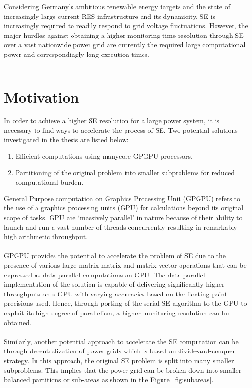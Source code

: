 \documentclass[thesis.tex]{subfiles}
\begin{document}
Considering Germany’s ambitious renewable energy targets and the state of increasingly large current RES infrastructure and its dynamicity, SE is increasingly required to readily respond to grid voltage fluctuations. However, the major hurdles against obtaining a higher monitoring time resolution through SE over a vast nationwide power grid are currently the required large computational power and correspondingly long execution times. \\\\

\section{Motivation}
In order to achieve a higher SE resolution for a large power system, it is necessary to find ways to accelerate the process of SE. Two potential solutions investigated in the thesis are listed below:
\begin{enumerate}
	\item Efficient computations using manycore GPGPU processors\cite{KarimipourAcc}.
	\item Partitioning of the original problem into smaller subproblems for reduced computational burden\cite{Xiong}\cite{Muscas}\cite{KarimipourDec}.
\end{enumerate}
General Purpose computation on Graphics Processing Unit (GPGPU) refers to the use of a graphics processing units (GPU) for calculations beyond its original scope of tasks. GPU are ‘massively parallel’ in nature because of their ability to launch and run a vast number of threads concurrently resulting in remarkably high arithmetic throughput.\\\\
GPGPU provides the potential to accelerate the problem of SE due to the presence of various large matrix-matrix and matrix-vector operations that can be expressed as data-parallel computations on GPU. The data-parallel implementation of the solution is capable of delivering significantly higher throughputs on a GPU with varying accuracies based on the floating-point precisions used. Hence, through porting of the serial SE algorithm to the GPU to exploit its high degree of parallelism, a higher monitoring resolution can be obtained.\\\\
Similarly, another potential approach to accelerate the SE computation can be through decentralization of power grids which is based on divide-and-conquer strategy. In this approach, the original SE problem is split into many smaller subproblems. This implies that the power grid can be broken down into smaller balanced partitions or sub-areas as shown in the Figure~\ref{fig:subareas}. 
\end{document}
